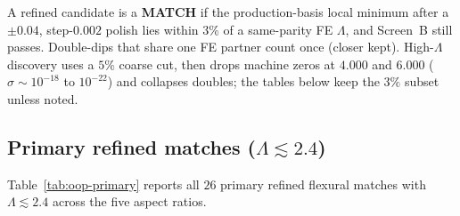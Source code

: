 \documentclass[11pt]{article}
\begin{document}
A refined candidate is a \textbf{MATCH} if the production-basis local
minimum after a $\pm 0.04$, step-$0.002$ polish lies within $3\%$ of a
same-parity FE $\Lambda$, and Screen~B still passes. Double-dips that
share one FE partner count once (closer kept). High-$\Lambda$ discovery
uses a $5\%$ coarse cut, then drops machine zeros at $4.000$ and $6.000$
($\sigma\sim 10^{-18}$ to $10^{-22}$) and collapses doubles; the tables
below keep the $3\%$ subset unless noted.

\subsection{Primary refined matches
(\texorpdfstring{$\Lambda\lesssim 2.4$}{Lambda ~< 2.4})}\label{sec:oop-primary}
Table~\ref{tab:oop-primary} reports all $26$ primary refined flexural matches with $\Lambda\lesssim 2.4$ across the five aspect ratios.
\end{document}
